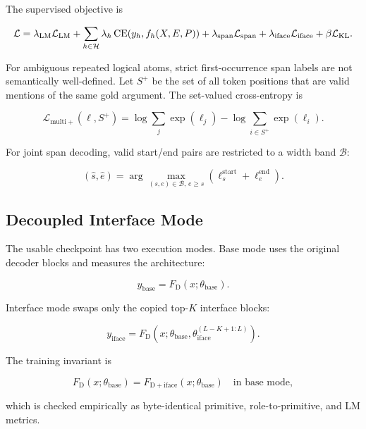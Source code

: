 The supervised objective is

\begin{equation}
\mathcal{L}
=
\lambda_{\mathrm{LM}}\mathcal{L}_{\mathrm{LM}}
+ \sum_{h \in \mathcal{H}} \lambda_h
   \operatorname{CE}(y_h, f_h(X,E,P))
+ \lambda_{\mathrm{span}}\mathcal{L}_{\mathrm{span}}
+ \lambda_{\mathrm{iface}}\mathcal{L}_{\mathrm{iface}}
+ \beta \mathcal{L}_{\mathrm{KL}}.
\label{eq:total_loss}
\end{equation}

For ambiguous repeated logical atoms, strict first-occurrence span labels are
not semantically well-defined. Let $S^+$ be the set of all token positions that
are valid mentions of the same gold argument. The set-valued cross-entropy is

\begin{equation}
\mathcal{L}_{\mathrm{multi+}}(\ell, S^+)
=
\log \sum_j \exp(\ell_j)
-
\log \sum_{i \in S^+} \exp(\ell_i).
\label{eq:multipositive_ce}
\end{equation}

For joint span decoding, valid start/end pairs are restricted to a width band
$\mathcal{B}$:

\begin{equation}
(\hat{s},\hat{e})
=
\arg\max_{(s,e)\in\mathcal{B},\,e\ge s}
\left(\ell^{\mathrm{start}}_s + \ell^{\mathrm{end}}_e\right).
\label{eq:joint_span_decode}
\end{equation}

\subsection{Decoupled Interface Mode}
\label{subsec:interface_mode}

The usable checkpoint has two execution modes. Base mode uses the original
decoder blocks and measures the architecture:

\begin{equation}
y_{\mathrm{base}} = F_{\mathrm{D}}(x;\theta_{\mathrm{base}}).
\label{eq:base_mode}
\end{equation}

Interface mode swaps only the copied top-$K$ interface blocks:

\begin{equation}
y_{\mathrm{iface}} =
F_{\mathrm{D}}\!\left(x;\theta_{\mathrm{base}},
                     \theta_{\mathrm{iface}}^{(L-K+1:L)}\right).
\label{eq:interface_mode}
\end{equation}

The training invariant is

\begin{equation}
F_{\mathrm{D}}(x;\theta_{\mathrm{base}})
=
F_{\mathrm{D+iface}}(x;\theta_{\mathrm{base}})
\quad \text{in base mode},
\label{eq:base_identity}
\end{equation}

which is checked empirically as byte-identical primitive, role-to-primitive,
and LM metrics.
